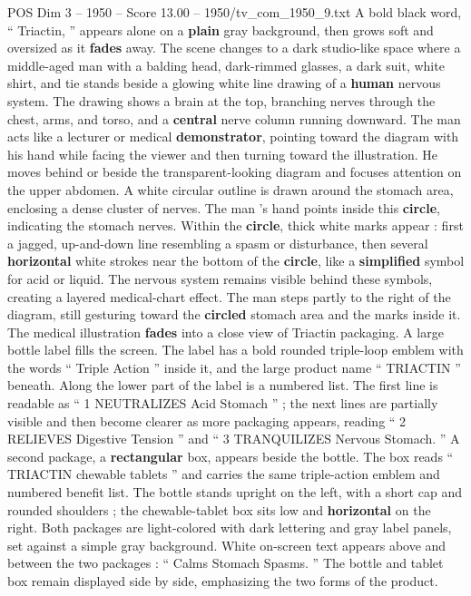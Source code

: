 \begin{textsample}{POS Dim 3 – 1950 – Score 13.00 – 1950/tv\_com\_1950\_9.txt}  \label{ex:f3_pos_012}
A bold black word, “ Triactin, ” appears alone on a \textbf{plain} gray background, then grows soft and oversized as it \textbf{fades} away.
The scene changes to a dark studio-like space where a middle-aged man with a balding head, dark-rimmed glasses, a dark suit, white shirt, and tie stands beside a glowing white line drawing of a \textbf{human} nervous system.
The drawing shows a brain at the top, branching nerves through the chest, arms, and torso, and a \textbf{central} nerve column running downward.
The man acts like a lecturer or medical \textbf{demonstrator}, pointing toward the diagram with his hand while facing the viewer and then turning toward the illustration.
He moves behind or beside the transparent-looking diagram and focuses attention on the upper abdomen.
A white circular outline is drawn around the stomach area, enclosing a dense cluster of nerves.
The man ’s hand points inside this \textbf{circle}, indicating the stomach nerves.
Within the \textbf{circle}, thick white marks appear : first a jagged, up-and-down line resembling a spasm or disturbance, then several \textbf{horizontal} white strokes near the bottom of the \textbf{circle}, like a \textbf{simplified} symbol for acid or liquid.
The nervous system remains visible behind these symbols, creating a layered medical-chart effect.
The man steps partly to the right of the diagram, still gesturing toward the \textbf{circled} stomach area and the marks inside it.
The medical illustration \textbf{fades} into a close view of Triactin packaging.
A large bottle label fills the screen.
The label has a bold rounded triple-loop emblem with the words “ Triple Action ” inside it, and the large product name “ TRIACTIN ” beneath.
Along the lower part of the label is a numbered list.
The first line is readable as “ 1 NEUTRALIZES Acid Stomach ” ; the next lines are partially visible and then become clearer as more packaging appears, reading “ 2 RELIEVES Digestive Tension ” and “ 3 TRANQUILIZES Nervous Stomach. ” A second package, a \textbf{rectangular} box, appears beside the bottle.
The box reads “ TRIACTIN chewable tablets ” and carries the same triple-action emblem and numbered benefit list.
The bottle stands upright on the left, with a short cap and rounded shoulders ; the chewable-tablet box sits low and \textbf{horizontal} on the right.
Both packages are light-colored with dark lettering and gray label panels, set against a simple gray background.
White on-screen text appears above and between the two packages : “ Calms Stomach Spasms. ” The bottle and tablet box remain displayed side by side, emphasizing the two forms of the product.

\end{textsample}
